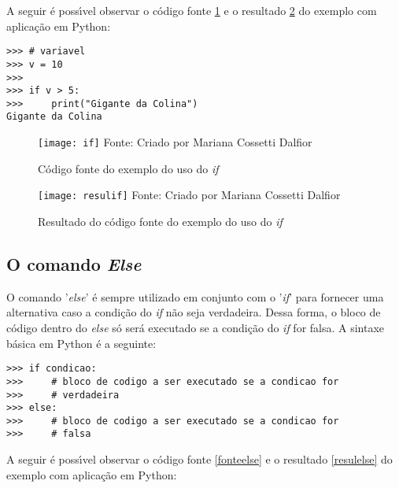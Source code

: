 A seguir \'{e} poss\'{\i}vel observar o c\'{o}digo fonte \ref{fonteif} e o resultado \ref{resulif} do exemplo com aplica\c{c}\~{a}o em Python:

\begin{lstlisting}
>>> # variavel
>>> v = 10
>>> 
>>> if v > 5:
>>> 	print("Gigante da Colina")
Gigante da Colina
\end{lstlisting}	

\begin{figure}[H]
	\begin{center}
		\caption{C\'{o}digo fonte do exemplo do uso do \textsl{if}} \label{fonteif}
		\texttt{[image: if]} 
		\newline
		Fonte: Criado por Mariana Cossetti Dalfior
	\end{center}
\end{figure}

\begin{figure}[H]
	\begin{center}
		\caption{Resultado do c\'{o}digo fonte do exemplo do uso do \textsl{if}} \label{resulif}
		\texttt{[image: resulif]} 
		\newline
		Fonte: Criado por Mariana Cossetti Dalfior
	\end{center}
\end{figure}
			\subsection{O comando \textsl{Else}}
O comando '\textsl{else}' \'{e} sempre utilizado em conjunto com o '\textsl{if}' para fornecer uma alternativa caso a condi\c{c}\~{a}o do \textsl{if} n\~{a}o seja verdadeira. Dessa forma, o bloco de c\'{o}digo dentro do \textsl{else} s\'{o} ser\'{a} executado se a condi\c{c}\~{a}o do \textsl{if} for falsa. A sintaxe b\'{a}sica em Python \'{e} a seguinte:
\begin{lstlisting}
>>> if condicao:
>>> 	# bloco de codigo a ser executado se a condicao for 
>>> 	# verdadeira
>>> else:
>>> 	# bloco de codigo a ser executado se a condicao for 
>>> 	# falsa
\end{lstlisting}	

A seguir \'{e} poss\'{\i}vel observar o c\'{o}digo fonte \ref{fonteelse} e o resultado \ref{resulelse} do exemplo com aplica\c{c}\~{a}o em Python:

